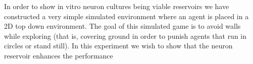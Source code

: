 In order to show in vitro neuron cultures being viable reservoirs we have
constructed a very simple simulated environment where an agent is placed in a
2D top down environment. The goal of this simulated game is to avoid walls while
exploring (that is, covering ground in order to punish agents that run in
circles or stand still).
In this experiment we wish to show that the neuron reservoir enhances the
performance 
